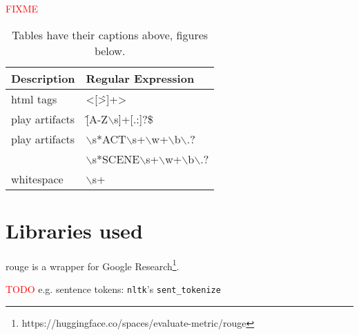 \textcolor{red}{FIXME}
\begin{table}[H]%
  \caption{Tables have their captions above, figures below.}
  \label{table-with-numbers}%
  \centering\small
  \begin{tabular}{@{}ll@{}} %
    \toprule
    \textbf{Description} & \textbf{Regular Expression}  \\
    \midrule
            html tags            & <[\^>]+> \\
            play artifacts       & \^[A-Z$\backslash$s]+[.:]?\$ \\
             play artifacts & $\backslash$s*ACT$\backslash$s+$\backslash$w+$\backslash$b$\backslash$.? \\
& $\backslash$s*SCENE$\backslash$s+$\backslash$w+$\backslash$b$\backslash$.? \\
whitespace           & $\backslash$s+ \\


    \bottomrule
  \end{tabular}
\end{table}











\section{Libraries used}
\label{app:libraries}

\ac{rouge} is a wrapper for Google Research\footnote{https://huggingface.co/spaces/evaluate-metric/rouge}.


\textcolor{red}{TODO}
e.g. sentence tokens: \texttt{nltk}'s \texttt{sent\_tokenize}